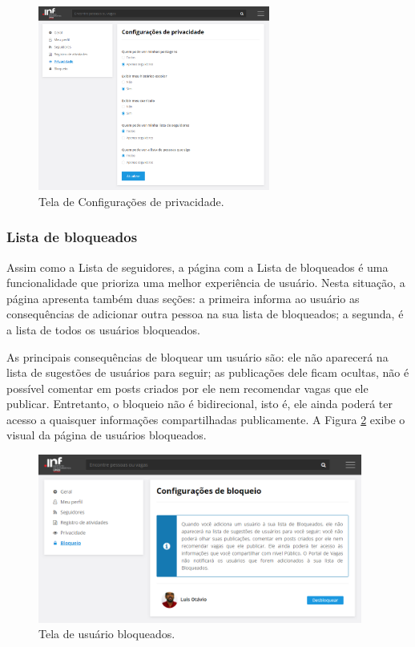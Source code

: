 \begin{figure}[ht]
    \caption{Tela de Configurações de privacidade.}
       	\begin{center}
            \includegraphics[width=0.68\textwidth]{figuras/config_02.png}
        \end{center}
    \label{telaConfigPrivacidade}
\end{figure}

\subsubsection{Lista de bloqueados}
\label{PDVFunConfiguracoesBloq}

Assim como a Lista de seguidores, a página com a Lista de bloqueados é uma funcionalidade que prioriza uma melhor experiência de usuário. Nesta situação, a página apresenta também duas seções: a primeira informa ao usuário as consequências de adicionar outra pessoa na sua lista de bloqueados; a segunda, é a lista de todos os usuários bloqueados.

As principais consequências de bloquear um usuário são: ele não aparecerá na lista de sugestões de usuários para seguir; as publicações dele ficam ocultas, não é possível comentar em posts criados por ele nem recomendar vagas que ele publicar. Entretanto, o bloqueio não é bidirecional, isto é, ele ainda poderá ter acesso a quaisquer informações compartilhadas publicamente. A Figura \ref{telaConfigBloq} exibe o visual da página de usuários bloqueados.

\begin{figure}[ht]
    \caption{Tela de usuário bloqueados.}
       	\begin{center}
            \includegraphics[width=0.95\textwidth]{figuras/config_04.png}
        \end{center}
    \label{telaConfigBloq}
\end{figure}

